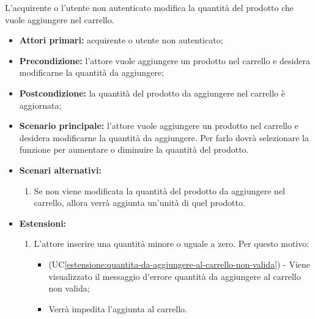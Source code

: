 \label{modifica-quantita-da-aggiungere-al-carrello}

L'acquirente o l'utente non autenticato modifica la quantità del prodotto che vuole aggiungere nel carrello.
\begin{itemize}
	\item \textbf{Attori primari:} acquirente o utente non autenticato;
	\item \textbf{Precondizione:} l'attore vuole aggiungere un prodotto nel carrello e desidera modificarne la quantità da aggiungere;
	\item \textbf{Postcondizione:} la quantità del prodotto da aggiungere nel carrello è aggiornata;
	\item \textbf{Scenario principale:} l'attore vuole aggiungere un prodotto nel carrello e desidera modificarne la quantità da aggiungere. Per farlo dovrà selezionare la funzione per aumentare o diminuire la quantità del prodotto.
	\item \textbf{Scenari alternativi:}
	\begin{enumerate}[label=\lett]
        \item Se non viene modificata la quantità del prodotto da aggiungere nel carrello, allora verrà aggiunta un'unità di quel prodotto.
    \end{enumerate}
	\item \textbf{Estensioni:}
	\begin{enumerate}[label=\lett]
        \item L'attore inserire una quantità minore o uguale a zero. Per questo motivo:
        \begin{itemize}
            \item (UC\ref{estensione:quantita-da-aggiungere-al-carrello-non-valida}) - Viene visualizzato il messaggio d'errore quantità da aggiungere al carrello non valida;
            \item Verrà impedita l'aggiunta al carrello.
        \end{itemize}
	\end{enumerate}
\end{itemize}

